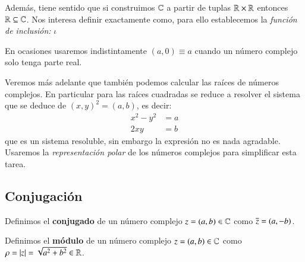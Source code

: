 Además, tiene sentido que si construimos $\mathbb{C}$ a partir de tuplas $\mathbb{R}\times \mathbb{R}$ entonces $\mathbb{R} \subseteq \mathbb{C}$. Nos interesa definir exactamente como, para ello establecemos la \textit{función de inclusión:} $\iota$\\

\begin{obs}
    En ocasiones usaremos indistintamente $(a, 0) \equiv a$ cuando un número complejo solo tenga parte real.
\end{obs}

Veremos más adelante que también podemos calcular las raíces de números complejos. En particular para las raíces cuadradas se reduce a resolver el sistema que se deduce de $(x, y)^2 = (a, b)$, es decir:
\begin{align*}
    x^2 - y^2 &= a\\
    2xy &= b
\end{align*}
que es un sistema resoluble, sin embargo la expresión no es nada agradable. Usaremos la \textit{representación polar} de los números complejos para simplificar esta tarea.

\subsection{Conjugaci\'on}
    \begin{dfn}
        Definimos el \textbf{conjugado} de un número complejo $z = (a, b) \in \mathbb{C}$ como $\overline{z} = (a, -b)$.
    \end{dfn}

    \begin{dfn}
        Definimos el \textbf{módulo} de un número complejo $z = (a, b) \in \mathbb{C}$ como $\rho = \left|z\right| = \sqrt{a^2 + b^2} \in \mathbb{R}$.
    \end{dfn}


